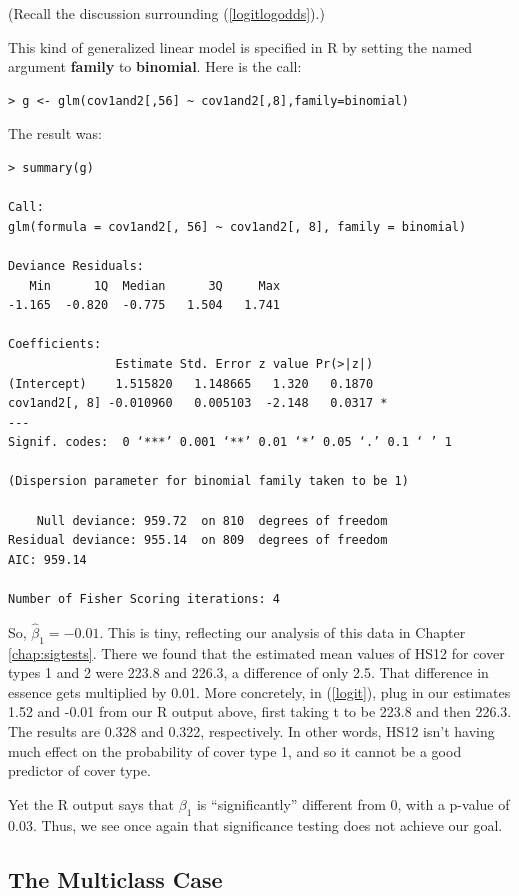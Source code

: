(Recall the discussion surrounding (\ref{logitlogodds}).)

This kind of generalized linear model is specified in R by setting the
named argument {\bf family} to {\bf binomial}.  Here is the call:

\begin{Verbatim}[fontsize=\relsize{-2}]
> g <- glm(cov1and2[,56] ~ cov1and2[,8],family=binomial)
\end{Verbatim}

The result was:

\begin{Verbatim}[fontsize=\relsize{-2}]
> summary(g)

Call:
glm(formula = cov1and2[, 56] ~ cov1and2[, 8], family = binomial)

Deviance Residuals:
   Min      1Q  Median      3Q     Max
-1.165  -0.820  -0.775   1.504   1.741

Coefficients:
               Estimate Std. Error z value Pr(>|z|)
(Intercept)    1.515820   1.148665   1.320   0.1870
cov1and2[, 8] -0.010960   0.005103  -2.148   0.0317 *
---
Signif. codes:  0 ‘***’ 0.001 ‘**’ 0.01 ‘*’ 0.05 ‘.’ 0.1 ‘ ’ 1

(Dispersion parameter for binomial family taken to be 1)

    Null deviance: 959.72  on 810  degrees of freedom
Residual deviance: 955.14  on 809  degrees of freedom
AIC: 959.14

Number of Fisher Scoring iterations: 4
\end{Verbatim}

So, $\widehat{\beta}_1 = -0.01$.  This is tiny, reflecting our analysis
of this data in Chapter \ref{chap:sigtests}.  There we found that the
estimated mean values of HS12 for cover types 1 and 2 were 223.8 and
226.3, a difference of only 2.5.  That difference in essence gets
multiplied by 0.01.  More concretely, in (\ref{logit}), plug in our
estimates 1.52 and -0.01 from our R output above, first taking t to be
223.8 and then 226.3.  The results are 0.328 and 0.322, respectively.
In other words, HS12 isn't having much effect on the probability of
cover type 1, and so it cannot be a good predictor of cover type.  

Yet the R output says that $\beta_1$ is ``significantly'' different from
0, with a p-value of 0.03.  Thus, we see once again that significance
testing does not achieve our goal.  

\subsection{The Multiclass Case} 


